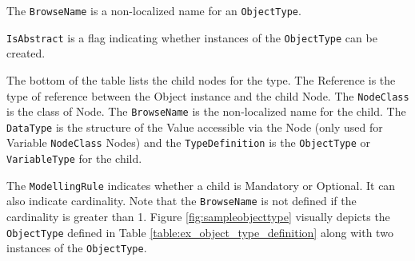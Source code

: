 The \texttt{BrowseName} is a non-localized name for an \texttt{ObjectType}. 

\texttt{IsAbstract} is a flag indicating whether instances of the \texttt{ObjectType} can be created.

The bottom of the table lists the child nodes for the type. The Reference is the type of reference between the Object instance and the child Node. The \texttt{NodeClass} is the class of Node. The \texttt{BrowseName} is the non-localized name for the child. The \texttt{DataType} is the structure of the Value accessible via the Node (only used for Variable \texttt{NodeClass} Nodes) and the \texttt{TypeDefinition} is the \texttt{ObjectType} or \texttt{VariableType} for the child. 

The \texttt{ModellingRule} indicates whether a child is Mandatory or Optional. It can also indicate cardinality. Note that the \texttt{BrowseName} is not defined if the cardinality is greater than 1. Figure \ref{fig:sampleobjecttype} visually depicts the \texttt{ObjectType} defined in Table \ref{table:ex_object_type_definition} along with two instances of the \texttt{ObjectType}.


\FloatBarrier
\fi
